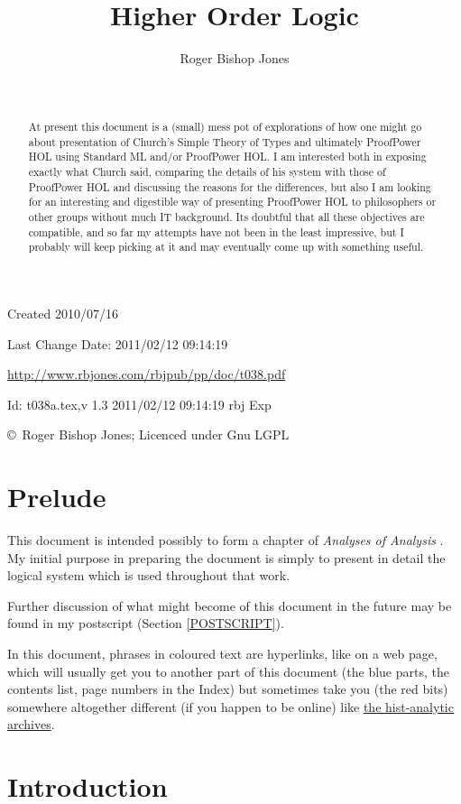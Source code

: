 \documentclass[11pt]{article}
\title{Higher Order Logic}
\author{Roger Bishop Jones}
\date{\ }
\begin{document}
\begin{titlepage}
\maketitle
\begin{abstract}
At present this document is a (small) mess pot of explorations of how one might go about presentation of Church's Simple Theory of Types and ultimately ProofPower HOL using Standard ML and/or ProofPower HOL.
I am interested both in exposing exactly what Church said, comparing the details of his system with those of ProofPower HOL and discussing the reasons for the differences, but also I am looking for an interesting and digestible way of presenting ProofPower HOL to philosophers or other groups without much IT background.
Its doubtful that all these objectives are compatible, and so far my attempts have not been in the least impressive, but I probably will keep picking at it and may eventually come up with something useful.
\end{abstract}
\vfill

\begin{centering}
{\footnotesize

Created 2010/07/16

Last Change $ $Date: 2011/02/12 09:14:19 $ $

\href{http://www.rbjones.com/rbjpub/pp/doc/t038.pdf}
{http://www.rbjones.com/rbjpub/pp/doc/t038.pdf}

$ $Id: t038a.tex,v 1.3 2011/02/12 09:14:19 rbj Exp $ $

\copyright\ Roger Bishop Jones; Licenced under Gnu LGPL

}%
\end{centering}

\thispagestyle{empty}
\end{titlepage}

\newpage
\addtocounter{page}{1}
{\parskip=0pt\tableofcontents}

\section{Prelude}

This document is intended possibly to form a chapter of {\it Analyses of Analysis} \cite{rbjb001}.
My initial purpose in preparing the document is simply to present in detail the logical system which is used throughout that work.

Further discussion of what might become of this document in the future may be found in my postscript (Section \ref{POSTSCRIPT}).

In this document, phrases in coloured text are hyperlinks, like on a web page, which will usually get you to another part of this document (the blue parts, the contents list, page numbers in the Index) but sometimes take you (the red bits) somewhere altogether different (if you happen to be online) like \href{http://rbjones.com/pipermail/hist-analytic_rbjones.com}{the hist-analytic archives}.

\section{Introduction}
\end{document}
